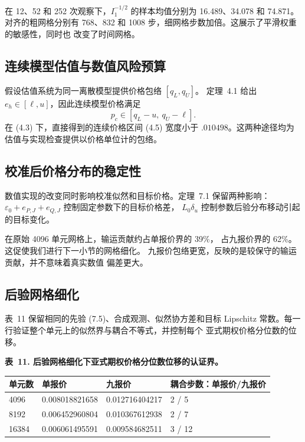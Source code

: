 在 12、52 和 252 次观察下，\(I_1^{-1/2}\) 的样本均值分别为
16.489、34.078 和 74.871。对齐的粗网格分别有 768、832 和
1008 步，细网格步数加倍。这展示了平滑权重的敏感性，同时也
改变了时间网格。

\subsection{连续模型估值与数值风险预算}

假设估值系统为同一离散模型提供价格包络 \([q_L,q_U]\)。
定理~4.1 给出 \(e_h\in[\ell,u]\)，因此连续模型价格满足
\[
p_c\in[q_L-u,\ q_U-\ell].
\tag{8.1}
\]
在 (4.3) 下，直接得到的连续价格区间 (4.5) 宽度小于
\(.010498\)。这两种途径均为估值与实现检查提供以价格单位计的包络。

\subsection{校准后价格分布的稳定性}

数值实现的改变同时影响校准似然和目标价格。定理~7.1 保留两种影响：
\(\varepsilon_0+e_{P,J}+e_{Q,J}\) 控制固定参数下的目标价格差，
\(L_0\delta_u\) 控制参数后验分布移动引起的目标变化。

在原始 4096 单元网格上，输运贡献约占单报价界的 39\%，
占九报价界的 62\%。这促使我们进行下一小节的网格细化。
九报价包络更宽，反映的是较保守的输运贡献，并不意味着真实数值
偏差更大。

\subsection{后验网格细化}

表~11 保留相同的先验 (7.5)、合成观测、似然协方差和目标 Lipschitz
常数。每一行验证整个单元上的似然界与耦合不等式，并控制每个
亚式期权价格分位数的位移。

\noindent\textbf{表~11. 后验网格细化下亚式期权价格分位数位移的认证界。}
\begin{center}
\begin{tabularx}{\textwidth}{@{}l X X X@{}}
\toprule
单元数 & 单报价 & 九报价 & 耦合步数：单报价/九报价 \\
\midrule
4096 & 0.008018821658 & 0.012716404217 & 2 / 5 \\
8192 & 0.006452960804 & 0.010367612938 & 2 / 7 \\
16384 & 0.006061495591 & 0.009584682511 & 3 / 12 \\
\bottomrule
\end{tabularx}
\end{center}


